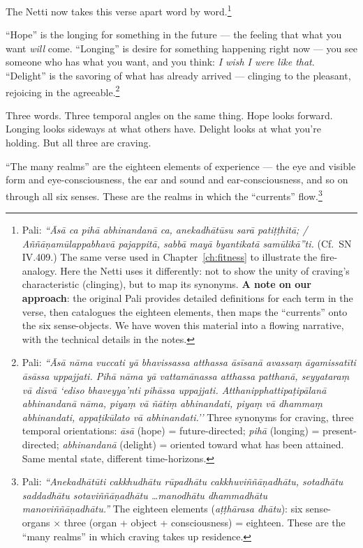 The Netti now takes this verse apart word by word.\footnote{Pali: \textit{``Āsā ca pihā abhinandanā ca, anekadhātūsu sarā patiṭṭhitā; / Aññāṇamūlappabhavā pajappitā, sabbā mayā byantikatā samūlikā''ti.} (Cf.\ SN IV.409.) The same verse used in Chapter~\ref{ch:fitness} to illustrate the fire-analogy. Here the Netti uses it differently: not to show the unity of craving's characteristic (clinging), but to map its synonyms. \textbf{A note on our approach}: the original Pali provides detailed definitions for each term in the verse, then catalogues the eighteen elements, then maps the ``currents'' onto the six sense-objects. We have woven this material into a flowing narrative, with the technical details in the notes.}

``Hope'' is the longing for something in the future --- the feeling that what you want \textit{will} come. ``Longing'' is desire for something happening right now --- you see someone who has what you want, and you think: \textit{I wish I were like that}. ``Delight'' is the savoring of what has already arrived --- clinging to the pleasant, rejoicing in the agreeable.\footnote{Pali: \textit{``Āsā nāma vuccati yā bhavissassa atthassa āsīsanā avassaṃ āgamissatīti āsāssa uppajjati. Pihā nāma yā vattamānassa atthassa patthanā, seyyataraṃ vā disvā `ediso bhaveyya'nti pihāssa uppajjati. Atthanipphattipaṭipālanā abhinandanā nāma, piyaṃ vā ñātiṃ abhinandati, piyaṃ vā dhammaṃ abhinandati, appaṭikūlato vā abhinandati.''} Three synonyms for craving, three temporal orientations: \textit{āsā} (hope) = future-directed; \textit{pihā} (longing) = present-directed; \textit{abhinandanā} (delight) = oriented toward what has been attained. Same mental state, different time-horizons.}

Three words. Three temporal angles on the same thing. Hope looks forward. Longing looks sideways at what others have. Delight looks at what you're holding. But all three are craving.

``The many realms'' are the eighteen elements of experience --- the eye and visible form and eye-consciousness, the ear and sound and ear-consciousness, and so on through all six senses. These are the realms in which the ``currents'' flow.\footnote{Pali: \textit{``Anekadhātūti cakkhudhātu rūpadhātu cakkhuviññāṇadhātu, sotadhātu saddadhātu sotaviññāṇadhātu \ldots manodhātu dhammadhātu manoviññāṇadhātu.''} The eighteen elements (\textit{aṭṭhārasa dhātu}): six sense-organs $\times$ three (organ + object + consciousness) = eighteen. These are the ``many realms'' in which craving takes up residence.}

